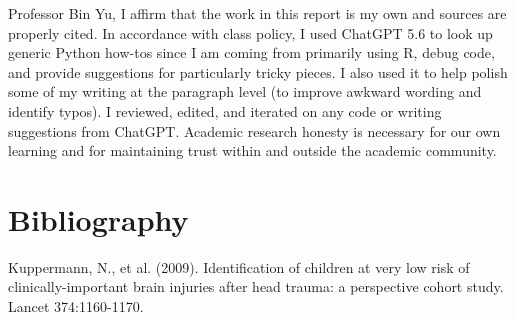 \documentclass[11pt,letterpaper]{article}
\begin{document}
Professor Bin Yu, I affirm that the work in this report is my own and sources are properly cited. 
In accordance with class policy, I used ChatGPT 5.6 to look up generic Python how-tos since I am coming from primarily using R, 
debug code, and provide suggestions for particularly tricky pieces. I also used it to help polish some 
of my writing at the paragraph level (to improve awkward wording and identify typos). I reviewed, edited, and
iterated on any code or writing suggestions from ChatGPT. Academic research honesty is necessary for our own learning 
and for maintaining trust within and outside the academic community.

\section{Bibliography}\label{bibliography}

Kuppermann, N., et al. (2009). Identification of children at very low risk of clinically-important brain injuries after head trauma:
a perspective cohort study. Lancet 374:1160-1170.
\end{document}
